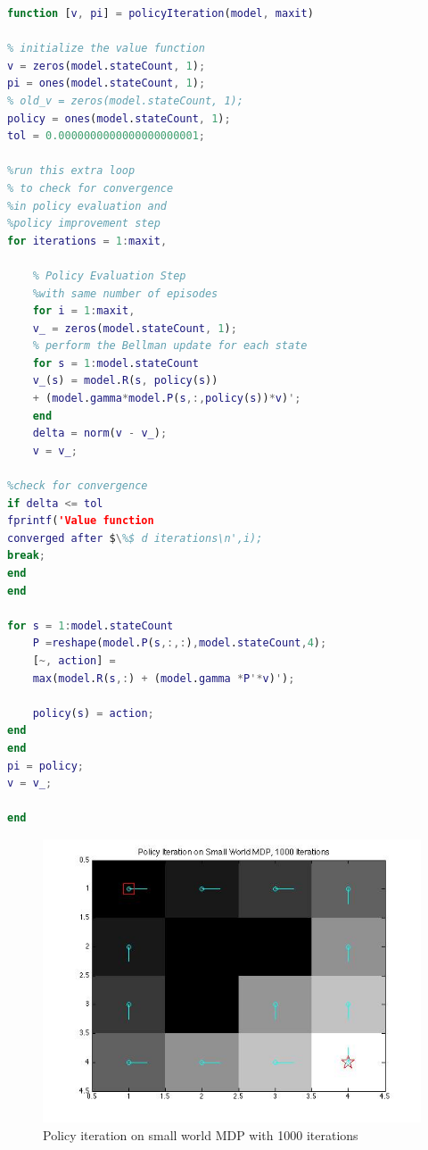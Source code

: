 \documentclass{article}\usepackage[]{graphicx}\usepackage[]{color}
\theoremstyle{plain}
\begin{document}
\begin{lstlisting}[language=Matlab, caption=Policy Iteration Algorithm]
function [v, pi] = policyIteration(model, maxit)

% initialize the value function
v = zeros(model.stateCount, 1);
pi = ones(model.stateCount, 1);
% old_v = zeros(model.stateCount, 1);
policy = ones(model.stateCount, 1);
tol = 0.0000000000000000000001;

%run this extra loop
% to check for convergence 
%in policy evaluation and 
%policy improvement step
for iterations = 1:maxit,
     
    % Policy Evaluation Step
    %with same number of episodes
    for i = 1:maxit,
    v_ = zeros(model.stateCount, 1);
    % perform the Bellman update for each state
    for s = 1:model.stateCount
    v_(s) = model.R(s, policy(s)) 
    + (model.gamma*model.P(s,:,policy(s))*v)';
    end          
    delta = norm(v - v_);
    v = v_;
    
%check for convergence
if delta <= tol
fprintf('Value function 
converged after $\%$ d iterations\n',i);
break;
end     
end    

for s = 1:model.stateCount    
    P =reshape(model.P(s,:,:),model.stateCount,4);    
    [~, action] = 
    max(model.R(s,:) + (model.gamma *P'*v)');
        
    policy(s) = action;
end
end
pi = policy;
v = v_;

end


\end{lstlisting}








\begin{figure}[h!]
  \includegraphics[scale=0.5]{policy1000_small.jpg}
  \caption{Policy iteration on small world MDP with 1000 iterations}
  \label{figure8}
\end{figure}
\end{document}
